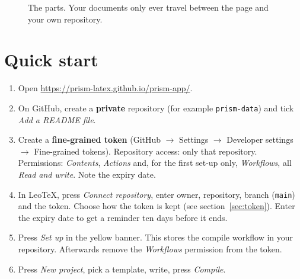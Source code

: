 \documentclass[11pt,a4paper]{article}
\newcommand{\leotex}{Leo\TeX{}}
\newcommand{\fpath}[1]{\texttt{\small #1}}
\begin{document}
\begin{figure}[h]
\centering
{}
\caption{The parts. Your documents only ever travel between the page and your own repository.}
\end{figure}

\section{Quick start}
\begin{enumerate}
  \item Open \url{https://prism-latex.github.io/prism-app/}.
  \item On GitHub, create a \textbf{private} repository (for example \fpath{prism-data}) and tick \emph{Add a README file}.
  \item Create a \textbf{fine-grained token} (GitHub $\rightarrow$ Settings $\rightarrow$ Developer settings $\rightarrow$ Fine-grained tokens).
        Repository access: only that repository. Permissions: \emph{Contents}, \emph{Actions} and, for the first set-up only, \emph{Workflows}, all
        \emph{Read and write}. Note the expiry date.
  \item In \leotex{}, press \emph{Connect repository}, enter owner, repository, branch (\fpath{main}) and the token. Choose how the token is
        kept (see section~\ref{sec:token}). Enter the expiry date to get a reminder ten days before it ends.
  \item Press \emph{Set up} in the yellow banner. This stores the compile workflow in your repository. Afterwards remove the
        \emph{Workflows} permission from the token.
  \item Press \emph{New project}, pick a template, write, press \emph{Compile}.
\end{enumerate}
\end{document}
